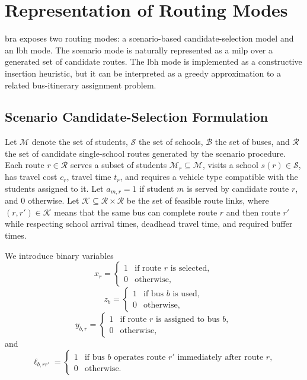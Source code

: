 \chapter{ Representation of  Routing Modes}
\label{ap:math}

\Gls{bra} exposes two routing modes: a scenario-based candidate-selection model and an \gls{lbh} mode. The scenario mode is naturally represented as a \gls{milp} over a generated set of candidate routes. The \gls{lbh} mode is implemented as a constructive insertion heuristic, but it can be interpreted as a greedy approximation to a related bus-itinerary assignment problem.

\section{Scenario Candidate-Selection Formulation}

Let $\mathcal{M}$ denote the set of students, $\mathcal{S}$ the set of schools, $\mathcal{B}$ the set of buses, and $\mathcal{R}$ the set of candidate single-school routes generated by the scenario procedure. Each route $r\in\mathcal{R}$ serves a subset of students $\mathcal{M}_r \subseteq\mathcal{M}$, visits a school $s\left(r\right)\in\mathcal{S}$, has travel cost $c_r$, travel time $t_r$, and requires a vehicle type compatible with the students assigned to it. Let $a_{m,r}=1$ if student $m$ is served by candidate route $r$, and 0 otherwise. Let $\mathcal{K}\subseteq\mathcal{R}\times\mathcal{R}$ be the set of feasible route links, where $\left(r,r'\right)\in\mathcal{K}$ means that the same bus can complete route $r$ and then route $r'$ while respecting school arrival times, deadhead travel time, and required buffer times.

We introduce binary variables
\[
x_r =
\begin{cases}
1 & \text{if route } r \text{ is selected},\\
0 & \text{otherwise,}
\end{cases}
\]
\[
z_b =
\begin{cases}
1 & \text{if bus } b \text{ is used},\\
0 & \text{otherwise,}
\end{cases}
\]
\[
y_{b,r} =
\begin{cases}
1 & \text{if route } r \text{ is assigned to bus } b,\\
0 & \text{otherwise,}
\end{cases}
\]
and
\[
\ell_{b,rr'} =
\begin{cases}
1 & \text{if bus } b \text{ operates route } r' \text{ immediately after route } r,\\
0 & \text{otherwise.}
\end{cases}
\]

